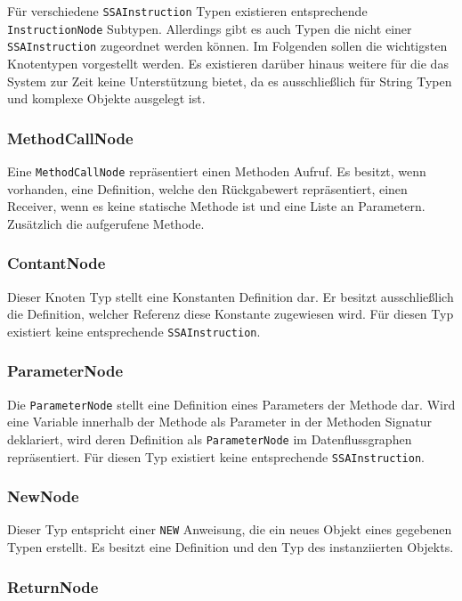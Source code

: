 Für verschiedene \texttt{SSAInstruction} Typen existieren entsprechende 
\texttt{InstructionNode} Subtypen. Allerdings gibt es auch Typen die nicht
einer \texttt{SSAInstruction} zugeordnet werden können. Im Folgenden sollen die
wichtigsten Knotentypen vorgestellt werden. Es existieren darüber hinaus weitere
für die das System zur Zeit keine Unterstützung bietet, da es ausschließlich für 
String Typen und komplexe Objekte ausgelegt ist.

\subsubsection{MethodCallNode}

Eine \texttt{MethodCallNode} repräsentiert einen Methoden Aufruf. Es besitzt, wenn
vorhanden, eine Definition, welche den Rückgabewert repräsentiert, einen Receiver, 
wenn es keine statische Methode ist und eine Liste an Parametern. Zusätzlich die 
aufgerufene Methode. 

\subsubsection{ContantNode}

Dieser Knoten Typ stellt eine Konstanten Definition dar. Er besitzt ausschließlich 
die Definition, welcher Referenz diese Konstante zugewiesen wird. Für diesen Typ
existiert keine entsprechende \texttt{SSAInstruction}.

\subsubsection{ParameterNode}

Die \texttt{ParameterNode} stellt eine Definition eines Parameters der Methode dar.
Wird eine Variable innerhalb der Methode als Parameter in der Methoden Signatur
deklariert, wird deren Definition als \texttt{ParameterNode} im Datenflussgraphen
repräsentiert. Für diesen Typ existiert keine entsprechende \texttt{SSAInstruction}.

\subsubsection{NewNode}

Dieser Typ entspricht einer \texttt{NEW} Anweisung, die ein neues Objekt eines 
gegebenen Typen erstellt. Es besitzt eine Definition und den Typ des instanziierten
Objekts. 

\subsubsection{ReturnNode}


